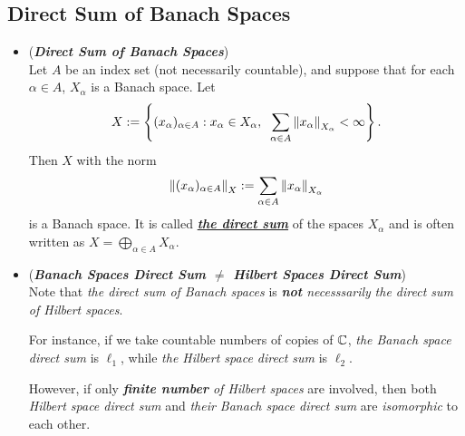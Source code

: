 \documentclass[11pt]{article}
\begin{document}
\subsection{Direct Sum of Banach Spaces}
\begin{itemize}
\item \begin{definition} (\emph{\textbf{Direct Sum of Banach Spaces}})\\
Let $A$ be an index set (not necessarily countable), and suppose that for each $\alpha\in A$, $X_{\alpha}$ is a Banach space. Let 
\begin{align*}
X := \left\{(x_\alpha)_{\alpha \in A}: x_{\alpha} \in X_{\alpha}, \;\; \sum_{\alpha \in A}\left\|x_{\alpha}\right\|_{X_{\alpha}} < \infty \right\}.
\end{align*} Then $X$ with the norm
\begin{align*}
\left\|(x_\alpha)_{\alpha \in A}\right\|_{X} := \sum_{\alpha \in A}\left\|x_{\alpha}\right\|_{X_{\alpha}}
\end{align*} is a Banach space. It is called \underline{\emph{\textbf{the direct sum}}} of the spaces $X_{\alpha}$ and is often written as $X = \bigoplus_{\alpha \in A} X_{\alpha}$.
\end{definition}

\item \begin{remark} (\emph{\textbf{Banach Spaces Direct Sum $\neq$  Hilbert Spaces Direct Sum}})\\
Note that \emph{the direct sum of Banach spaces} is \emph{\textbf{not} necesssarily} \emph{the direct sum of Hilbert spaces}. 

For instance, if we take countable numbers of copies of ${\mathbb C}$, \emph{the Banach space direct sum} is $\ell_1$, while \emph{the Hilbert space direct sum} is $\ell_2$.

However, if only \emph{\textbf{finite number} of Hilbert spaces} are involved, then both \emph{Hilbert space direct sum} and \emph{their Banach space direct sum} are \emph{isomorphic} to each other.
\end{remark}
\end{itemize}
\end{document}
